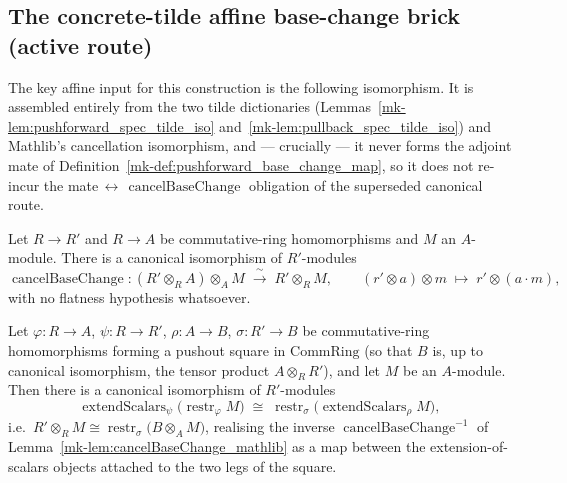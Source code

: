 \subsection{The concrete-tilde affine base-change brick (active route)}
\label{mk-subsec:fbc_concrete_brick}

The key affine input for this construction is the following isomorphism. It
is assembled entirely from the two tilde dictionaries
(Lemmas~\ref{mk-lem:pushforward_spec_tilde_iso} and~\ref{mk-lem:pullback_spec_tilde_iso}) and
Mathlib's cancellation isomorphism, and --- crucially --- it never forms the adjoint
mate of Definition~\ref{mk-def:pushforward_base_change_map}, so it does not re-incur the
mate\(\,\leftrightarrow\,\operatorname{cancelBaseChange}\) obligation of the
superseded canonical route.

\begin{lemma}
  \label{mk-lem:cancelBaseChange_mathlib}
  \mathlibok

  Let \(R \to R'\) and \(R \to A\) be commutative-ring homomorphisms and \(M\) an
  \(A\)-module. There is a canonical isomorphism of \(R'\)-modules
  \[
    \operatorname{cancelBaseChange} :
    (R' \otimes_R A) \otimes_A M \;\xrightarrow{\ \sim\ }\; R' \otimes_R M,
    \qquad (r' \otimes a) \otimes m \;\mapsto\; r' \otimes (a \cdot m),
  \]
  with no flatness hypothesis whatsoever.
\end{lemma}

\begin{lemma}\label{mk-lem:baseChangeCancelModuleIso}
  \leanok

  Let \(\varphi : R \to A\), \(\psi : R \to R'\), \(\rho : A \to B\),
  \(\sigma : R' \to B\) be commutative-ring homomorphisms forming a pushout square in
  \(\mathrm{CommRing}\) (so that \(B\) is, up to canonical isomorphism, the tensor
  product \(A \otimes_R R'\)), and let \(M\) be an \(A\)-module. Then there is a
  canonical isomorphism of \(R'\)-modules
  \[
    \operatorname{extendScalars}_\psi\bigl(\operatorname{restr}_\varphi M\bigr)
    \;\cong\;
    \operatorname{restr}_\sigma\bigl(\operatorname{extendScalars}_\rho M\bigr),
  \]
  i.e.\ \(R' \otimes_R M \cong \operatorname{restr}_\sigma\bigl(B \otimes_A M\bigr)\),
  realising the inverse \(\operatorname{cancelBaseChange}^{-1}\) of
  Lemma~\ref{mk-lem:cancelBaseChange_mathlib} as a map between the extension-of-scalars
  objects attached to the two legs of the square.
\end{lemma}

